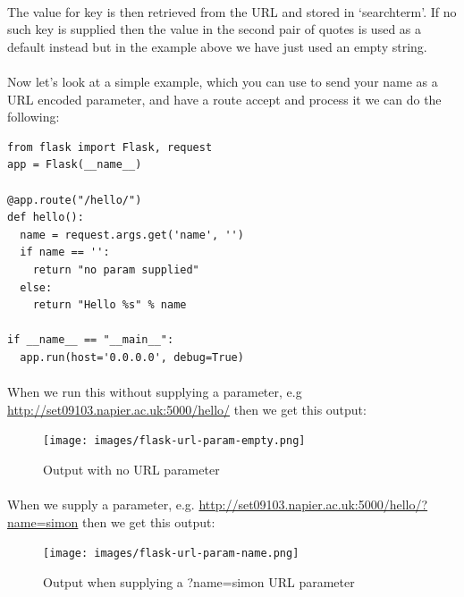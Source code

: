\documentclass[12pt, a4paper, oneside]{book}
\begin{document}
{\paragraph{} The value for key is then retrieved from the URL and stored in `searchterm'. If no such key is supplied then the value in the second pair of quotes is used as a default instead but in the example above we have just used an empty string.

\paragraph{} Now let's look at a simple example, which you can use to send your name as a URL encoded parameter, and have a route accept and process it we can do the following:

\begin{lstlisting}
from flask import Flask, request
app = Flask(__name__)

@app.route("/hello/")
def hello():
  name = request.args.get('name', '')
  if name == '':
    return "no param supplied"
  else:
    return "Hello %s" % name

if __name__ == "__main__":
  app.run(host='0.0.0.0', debug=True)
\end{lstlisting}

\paragraph{} When we run this without supplying a parameter, e.g \url{http://set09103.napier.ac.uk:5000/hello/} then we get this output:

\begin{figure}[H]
\centering
\texttt{[image: images/flask-url-param-empty.png]}
\caption{Output with no URL parameter}
\label{fig:flask-url-param-empty}
\end{figure}

\paragraph{} When we supply a parameter, e.g. \url{http://set09103.napier.ac.uk:5000/hello/?name=simon} then we get this output:

\begin{figure}[H]
\centering
\texttt{[image: images/flask-url-param-name.png]}
\caption{Output when supplying a ?name=simon URL parameter}
\label{fig:flask-url-param-name}
\end{figure}


}
\end{document}
